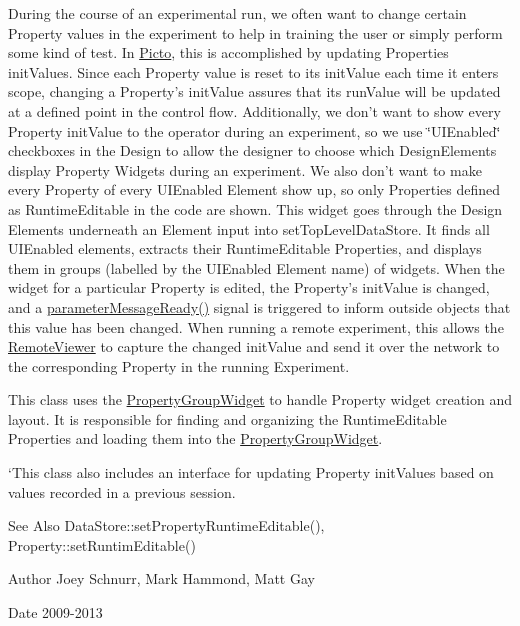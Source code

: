 During the course of an experimental run, we often want to change certain Property values in the experiment to help in training the user or simply perform some kind of test. In \hyperlink{namespace_picto}{Picto}, this is accomplished by updating Properties init\-Values. Since each Property value is reset to its init\-Value each time it enters scope, changing a Property's init\-Value assures that its run\-Value will be updated at a defined point in the control flow. Additionally, we don't want to show every Property init\-Value to the operator during an experiment, so we use \char`\"{}\-U\-I\-Enabled\char`\"{} checkboxes in the Design to allow the designer to choose which Design\-Elements display Property Widgets during an experiment. We also don't want to make every Property of every U\-I\-Enabled Element show up, so only Properties defined as Runtime\-Editable in the code are shown. This widget goes through the Design Elements underneath an Element input into set\-Top\-Level\-Data\-Store. It finds all U\-I\-Enabled elements, extracts their Runtime\-Editable Properties, and displays them in groups (labelled by the U\-I\-Enabled Element name) of widgets. When the widget for a particular Property is edited, the Property's init\-Value is changed, and a \hyperlink{class_property_frame_ad7ddd1a1b2d9cf25db6670a8c458bcc7}{parameter\-Message\-Ready()} signal is triggered to inform outside objects that this value has been changed. When running a remote experiment, this allows the \hyperlink{class_remote_viewer}{Remote\-Viewer} to capture the changed init\-Value and send it over the network to the corresponding Property in the running Experiment.

This class uses the \hyperlink{class_property_group_widget}{Property\-Group\-Widget} to handle Property widget creation and layout. It is responsible for finding and organizing the Runtime\-Editable Properties and loading them into the \hyperlink{class_property_group_widget}{Property\-Group\-Widget}.

`\-This class also includes an interface for updating Property init\-Values based on values recorded in a previous session. \begin{DoxySeeAlso}{See Also}
Data\-Store\-::set\-Property\-Runtime\-Editable(), Property\-::set\-Runtim\-Editable() 
\end{DoxySeeAlso}
\begin{DoxyAuthor}{Author}
Joey Schnurr, Mark Hammond, Matt Gay 
\end{DoxyAuthor}
\begin{DoxyDate}{Date}
2009-\/2013 
\end{DoxyDate}


